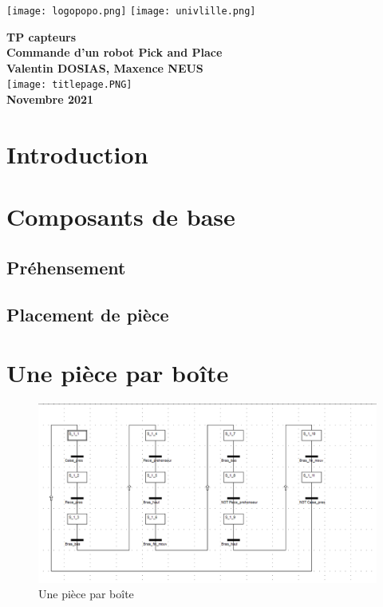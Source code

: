 \documentclass[oneside,a4paper,12pt]{article}
\begin{document}
	\begin{titlepage}
		\texttt{[image: logopopo.png]}
		\hspace*{\fill}
		\texttt{[image: univlille.png]}
		
		\begin{center}
			\vspace{1cm}
			\textbf{TP capteurs}\\
			\textbf{Commande d'un robot Pick and Place}\\
			\vspace{1cm}
			\textbf{Valentin DOSIAS, Maxence NEUS}\\
			\vspace{3cm}
			\texttt{[image: titlepage.PNG]}\\
			\vspace{\fill}
			\textbf{Novembre 2021}\\
		\end{center}
	\end{titlepage}
	
	\tableofcontents
	\newpage
	
	\section{Introduction}
	
	\section{Composants de base}
		\subsection{Préhensement}
		
		\subsection{Placement de pièce}
	
	\section{Une pièce par boîte}
		\begin{figure}[h]
			\centering
			\includegraphics[width=15cm]{grafcet1.PNG}
			\caption{Une pièce par boîte}
		\end{figure}
	
\end{document}
